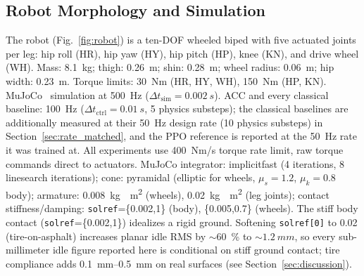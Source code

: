 \documentclass[a4paper,fleqn]{cas-dc}
\begin{document}
\subsection{Robot Morphology and Simulation}
The robot (Fig.~\ref{fig:robot}) is a ten-DOF wheeled biped with five actuated joints per leg: hip roll (HR), hip yaw (HY), hip pitch (HP), knee (KN), and drive wheel (WH).
Mass: \SI{8.1}{kg}; thigh: \SI{0.26}{m}; shin: \SI{0.28}{m}; wheel radius: \SI{0.06}{m}; hip width: \SI{0.23}{m}.
Torque limits: \SI{30}{Nm} (HR, HY, WH), \SI{150}{Nm} (HP, KN).
MuJoCo~\cite{mujoco} simulation at \SI{500}{Hz} ($\Delta t_{\text{sim}}=\SI{0.002}{s}$). ACC and every classical baseline: \SI{100}{Hz} ($\Delta t_{\text{ctrl}}=\SI{0.01}{s}$, \num{5} physics substeps); the classical baselines are additionally measured at their \SI{50}{Hz} design rate (\num{10} physics substeps) in Section~\ref{sec:rate_matched}, and the PPO reference is reported at the \SI{50}{Hz} rate it was trained at. All experiments use \SI{400}{Nm/s} torque rate limit, raw torque commands direct to actuators. MuJoCo integrator: implicitfast (4 iterations, 8 linesearch iterations); cone: pyramidal (elliptic for wheels, $\mu_s{=}1.2$, $\mu_k{=}0.8$ body); armature: \SI{0.008}{kg{\cdot}m^2} (wheels), \SI{0.02}{kg{\cdot}m^2} (leg joints); contact stiffness/damping: \texttt{solref}=\{0.002,1\} (body), \{0.005,0.7\} (wheels).
The stiff body contact (\texttt{solref}=\{0.002,1\}) idealizes a rigid ground. Softening \texttt{solref[0]} to 0.02 (tire-on-asphalt) increases planar idle RMS by ${\sim}$\SI{60}{\percent} to ${\sim}\SI{1.2}{mm}$, so every sub-millimeter idle figure reported here is conditional on stiff ground contact; tire compliance adds \SIrange{0.1}{0.5}{mm} on real surfaces (see Section~\ref{sec:discussion}).
\end{document}
